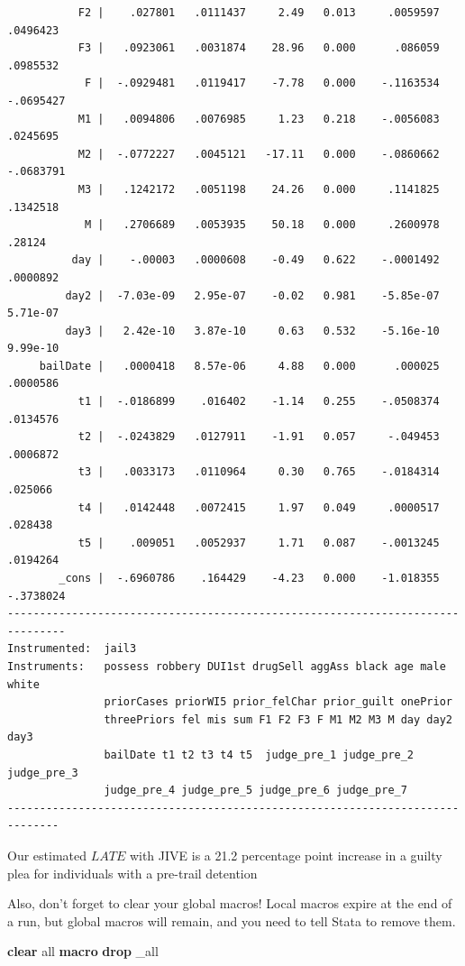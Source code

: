 \documentclass[
]{book}
\newenvironment{Shaded}{\begin{snugshade}}{\end{snugshade}}
\newcommand{\DataTypeTok}[1]{\textcolor[rgb]{0.13,0.29,0.53}{#1}}
\newcommand{\KeywordTok}[1]{\textcolor[rgb]{0.13,0.29,0.53}{\textbf{#1}}}
\newcommand{\OtherTok}[1]{\textcolor[rgb]{0.56,0.35,0.01}{#1}}
\begin{document}
\begin{verbatim}
           F2 |    .027801   .0111437     2.49   0.013     .0059597    .0496423
           F3 |   .0923061   .0031874    28.96   0.000      .086059    .0985532
            F |  -.0929481   .0119417    -7.78   0.000    -.1163534   -.0695427
           M1 |   .0094806   .0076985     1.23   0.218    -.0056083    .0245695
           M2 |  -.0772227   .0045121   -17.11   0.000    -.0860662   -.0683791
           M3 |   .1242172   .0051198    24.26   0.000     .1141825    .1342518
            M |   .2706689   .0053935    50.18   0.000     .2600978      .28124
          day |    -.00003   .0000608    -0.49   0.622    -.0001492    .0000892
         day2 |  -7.03e-09   2.95e-07    -0.02   0.981    -5.85e-07    5.71e-07
         day3 |   2.42e-10   3.87e-10     0.63   0.532    -5.16e-10    9.99e-10
     bailDate |   .0000418   8.57e-06     4.88   0.000      .000025    .0000586
           t1 |  -.0186899    .016402    -1.14   0.255    -.0508374    .0134576
           t2 |  -.0243829   .0127911    -1.91   0.057     -.049453    .0006872
           t3 |   .0033173   .0110964     0.30   0.765    -.0184314     .025066
           t4 |   .0142448   .0072415     1.97   0.049     .0000517     .028438
           t5 |    .009051   .0052937     1.71   0.087    -.0013245    .0194264
        _cons |  -.6960786    .164429    -4.23   0.000    -1.018355   -.3738024
-------------------------------------------------------------------------------
Instrumented:  jail3
Instruments:   possess robbery DUI1st drugSell aggAss black age male white
               priorCases priorWI5 prior_felChar prior_guilt onePrior
               threePriors fel mis sum F1 F2 F3 F M1 M2 M3 M day day2 day3
               bailDate t1 t2 t3 t4 t5  judge_pre_1 judge_pre_2 judge_pre_3
               judge_pre_4 judge_pre_5 judge_pre_6 judge_pre_7
------------------------------------------------------------------------------
\end{verbatim}

Our estimated \(LATE\) with JIVE is a 21.2 percentage point increase in a guilty plea for individuals with a pre-trail detention

Also, don't forget to clear your global macros! Local macros expire at the end of a run, but global macros will remain, and you need to tell Stata to remove them.

\begin{Shaded}
\begin{Highlighting}[]
\KeywordTok{clear} \OtherTok{all} 
\KeywordTok{macro} \KeywordTok{drop} \DataTypeTok{\_all}
\end{Highlighting}
\end{Shaded}
\end{document}
